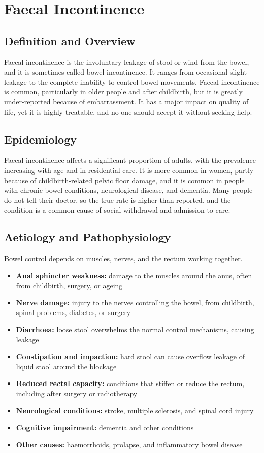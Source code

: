 \chapter{Faecal Incontinence}

\section*{Definition and Overview}
Faecal incontinence is the involuntary leakage of stool or wind from the bowel, and it is sometimes called bowel incontinence. It ranges from occasional slight leakage to the complete inability to control bowel movements. Faecal incontinence is common, particularly in older people and after childbirth, but it is greatly under-reported because of embarrassment. It has a major impact on quality of life, yet it is highly treatable, and no one should accept it without seeking help.

\section*{Epidemiology}
Faecal incontinence affects a significant proportion of adults, with the prevalence increasing with age and in residential care. It is more common in women, partly because of childbirth-related pelvic floor damage, and it is common in people with chronic bowel conditions, neurological disease, and dementia. Many people do not tell their doctor, so the true rate is higher than reported, and the condition is a common cause of social withdrawal and admission to care.

\section*{Aetiology and Pathophysiology}
Bowel control depends on muscles, nerves, and the rectum working together.
\begin{itemize}
    \item \textbf{Anal sphincter weakness:} damage to the muscles around the anus, often from childbirth, surgery, or ageing
    \item \textbf{Nerve damage:} injury to the nerves controlling the bowel, from childbirth, spinal problems, diabetes, or surgery
    \item \textbf{Diarrhoea:} loose stool overwhelms the normal control mechanisms, causing leakage
    \item \textbf{Constipation and impaction:} hard stool can cause overflow leakage of liquid stool around the blockage
    \item \textbf{Reduced rectal capacity:} conditions that stiffen or reduce the rectum, including after surgery or radiotherapy
    \item \textbf{Neurological conditions:} stroke, multiple sclerosis, and spinal cord injury
    \item \textbf{Cognitive impairment:} dementia and other conditions
    \item \textbf{Other causes:} haemorrhoids, prolapse, and inflammatory bowel disease
\end{itemize}

